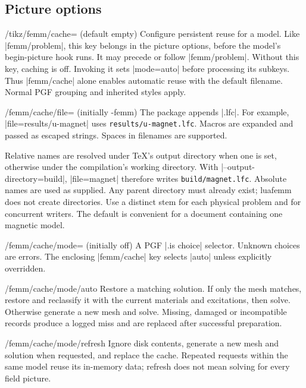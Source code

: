 \subsection{Picture options}
\begin{key}{/tikz/femm/cache= (default \normalfont empty)}
Configure persistent reuse for a model. Like |femm/problem|, this key
belongs in the picture options, before the model's begin-picture hook
runs. It may precede or follow |femm/problem|. Without this key, caching
is off. Invoking it sets |mode=auto| before processing its subkeys.
Thus |femm/cache| alone enables automatic reuse with the default filename.
Normal PGF grouping and inherited styles apply.
\end{key}
\begin{key}{/femm/cache/file= (initially \string\jobname-femm)}
The package appends |.lfc|. For example, |file=results/u-magnet| uses
\nolinkurl{results/u-magnet.lfc}. Macros are expanded and passed as escaped
strings. Spaces in filenames are supported.

Relative names are resolved under TeX's output directory when one is set,
otherwise under the compilation's working directory. With
|--output-directory=build|, |file=magnet| therefore writes
\nolinkurl{build/magnet.lfc}. Absolute names are used as supplied.
Any parent directory must already exist; luafemm does not create directories.
Use a distinct stem for each physical problem and for concurrent writers.
The default is convenient for a document containing one magnetic model.
\end{key}
\begin{key}{/femm/cache/mode= (initially off)}
A PGF |.is choice| selector. Unknown choices are errors. The enclosing
|femm/cache| key selects |auto| unless explicitly overridden.
\end{key}
\begin{key}{/femm/cache/mode/auto}
Restore a matching solution. If only the mesh matches, restore and
reclassify it with the current materials and excitations, then solve.
Otherwise generate a new mesh and solve. Missing, damaged or incompatible
records produce a logged miss and are replaced after successful preparation.
\end{key}
\begin{key}{/femm/cache/mode/refresh}
Ignore disk contents, generate a new mesh and solution when requested,
and replace the cache. Repeated requests within the same model reuse its
in-memory data; refresh does not mean solving for every field picture.
\end{key}
